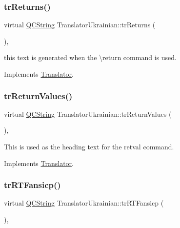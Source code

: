 \subsubsection{\texorpdfstring{trReturns()}{trReturns()}}
{\footnotesize\ttfamily virtual \mbox{\hyperlink{class_q_c_string}{Q\+C\+String}} Translator\+Ukrainian\+::tr\+Returns (\begin{DoxyParamCaption}{ }\end{DoxyParamCaption})\hspace{0.3cm}{\ttfamily [inline]}, {\ttfamily [virtual]}}

this text is generated when the \textbackslash{}return command is used. 

Implements \mbox{\hyperlink{class_translator}{Translator}}.

\mbox{\label{class_translator_ukrainian_a746c89c35635b224f84c3761181f31b1}} 
\subsubsection{\texorpdfstring{trReturnValues()}{trReturnValues()}}
{\footnotesize\ttfamily virtual \mbox{\hyperlink{class_q_c_string}{Q\+C\+String}} Translator\+Ukrainian\+::tr\+Return\+Values (\begin{DoxyParamCaption}{ }\end{DoxyParamCaption})\hspace{0.3cm}{\ttfamily [inline]}, {\ttfamily [virtual]}}

This is used as the heading text for the retval command. 

Implements \mbox{\hyperlink{class_translator}{Translator}}.

\mbox{\label{class_translator_ukrainian_a1c1ac485f5a2e6ef35b432925580cb13}} 
\subsubsection{\texorpdfstring{trRTFansicp()}{trRTFansicp()}}
{\footnotesize\ttfamily virtual \mbox{\hyperlink{class_q_c_string}{Q\+C\+String}} Translator\+Ukrainian\+::tr\+R\+T\+Fansicp (\begin{DoxyParamCaption}{ }\end{DoxyParamCaption})\hspace{0.3cm}{\ttfamily [inline]}, {\ttfamily [virtual]}}

